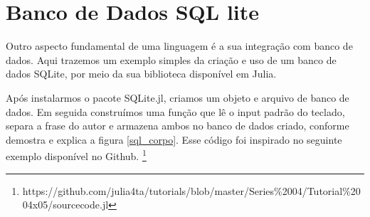 


\section{Banco de Dados SQL lite}
Outro aspecto fundamental de uma linguagem é a sua integração com banco de dados. Aqui trazemos um exemplo simples da criação e uso de um banco de dados SQLite, por meio da sua biblioteca disponível em Julia. 

Após instalarmos o pacote SQLite.jl, criamos um objeto e arquivo de banco de dados. Em seguida construímos uma função que lê o input padrão do teclado, separa a frase do autor e armazena ambos no banco de dados criado, conforme demostra e explica a figura \ref{sql_corpo}.
Esse código foi inspirado no seguinte exemplo disponível no Github. \footnote{https://github.com/julia4ta/tutorials/blob/master/Series\%2004/Tutorial\%2004x05/sourcecode.jl}


